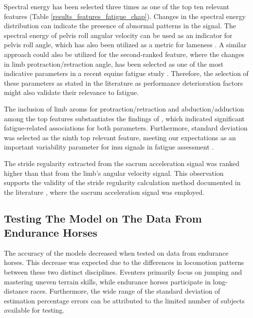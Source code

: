 Spectral energy has been selected three times as one of the top ten relevant features (Table \ref{results_features_fatigue_chap}). Changes in the spectral energy distribution can indicate the presence of abnormal patterns in the signal. The spectral energy of pelvis roll angular velocity can be used as an indicator for pelvis roll angle, which has also been utilized as a metric for lameness \cite{Jiang2021-cd}. A similar approach could also be utilized for the second-ranked feature, where the changes in limb protraction/retraction angle, has been selected as one of the most indicative parameters in a recent equine fatigue study \cite{Ishii2013-mp}. Therefore, the selection of these parameters as stated in the literature as performance deterioration factors might also validate their relevance to fatigue.

The inclusion of limb \gls{arom}s for protraction/retraction and abduction/adduction among the top features substantiates the findings of \cite{Ishii2013-mp}, which indicated significant fatigue-related associations for both parameters. Furthermore, standard deviation was selected as the ninth top relevant feature, meeting our expectations as an important variability parameter for \gls{imu} signals in fatigue assessment \cite{Ishii2013-mp}.

The stride regularity extracted from the sacrum acceleration signal was ranked higher than that from the limb's angular velocity signal. This observation supports the validity of the stride regularity calculation method documented in the literature \cite{Bryce2012-jl}, where the sacrum acceleration signal was employed.


\subsection{Testing The Model on The Data From Endurance Horses}
The accuracy of the models decreased when tested on data from endurance horses. This decrease was expected due to the differences in locomotion patterns between these two distinct disciplines. Eventers primarily focus on jumping and mastering uneven terrain skills, while endurance horses participate in long-distance races. Furthermore, the wide range of the standard deviation of estimation percentage errors can be attributed to the limited number of subjects available for testing.





